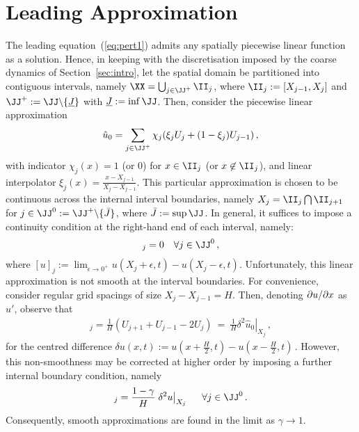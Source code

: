 \documentclass[12pt,a5paper]{article}
\begin{document}
\section{Leading Approximation}
The leading equation~(\ref{eq:pert1}) admits any spatially piecewise linear function as a solution. 
Hence, in keeping
with the discretisation imposed by the coarse dynamics of Section~\ref{sec:intro},
let the spatial domain be partitioned into contiguous intervals, namely $\XX=\bigcup_{j\in\JJ^+}\II_j$, where
$\II_j:=[X_{j-1},X_j]$ and $\JJ^+:=\JJ\backslash\{\underline{J}\}$ with $\underline{J}:=\inf\JJ$.
Then, consider the piecewise  linear approximation
\begin{eqnarray}
   \hat{u}_0 = \sum_{j\in\JJ^+}\chi_j(\xi_j U_j+(1-\xi_j)U_{j-1})\,,
\label{eq:uhat0}
\end{eqnarray}
with indicator $\chi_j(x)=1$ (or 0) for $x\in\II_j$ (or $x\not\in\II_j$), and linear interpolator
$\xi_j(x)=\frac{x-X_{j-1}}{X_j-X_{j-1}}$.
This particular approximation is chosen to be continuous across the 
internal interval boundaries,
namely $X_j=\II_j\bigcap\II_{j+1}$ for $j\in\JJ^0:=\JJ^+\backslash\{\bar{J}\}$, where $\bar{J}:=\sup\JJ$. 
In general, it suffices 
to impose a continuity condition at the right-hand end of each interval, namely:
\begin{eqnarray}
   [u]_j = 0 && \forall j\in\JJ^0\,,
\label{eq:cont-cond}
\end{eqnarray}
where $ [u]_j := \lim_{\epsilon\rightarrow 0^{+}} u(X_j+\epsilon,t)-u(X_j-\epsilon,t)$.
Unfortunately, this linear approximation is not smooth at the interval boundaries. 
For convenience, consider regular grid spacings of size 
$X_j-X_{j-1}=H$. Then, denoting $\D xu$ as $u'$, observe that
\begin{eqnarray}
   [\hat{u}'_0]_j = \frac{1}{H}(U_{j+1}+U_{j-1}-2U_j)~=~\frac{1}{H}\left.\delta^{2}\hat{u}_0\right|_{X_j}\,,
\end{eqnarray}
for the centred difference $\delta u(x,t):= u(x+\frac{H}{2},t)-u(x-\frac{H}{2},t)$\,.
However, this non-smoothness may be corrected at higher order by imposing a further internal boundary condition, namely
\begin{eqnarray}
   [u']_j = \frac{1-\gamma}{H}\left.\delta^{2}u\right|_{X_j}\hspace*{5mm}\forall j\in\JJ^0\,.
\label{eq:smooth-cond}
\end{eqnarray}
Consequently, smooth approximations are found in the limit as $\gamma\rightarrow 1$.
\end{document}
